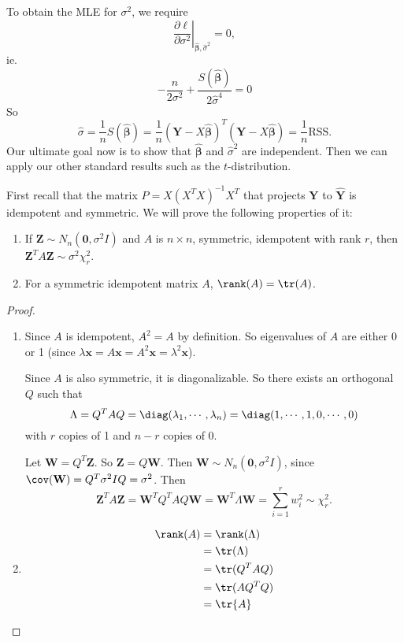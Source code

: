 \documentclass[a4paper]{article}
\begin{document}
To obtain the MLE for $\sigma^2$, we require
\[
  \left.\frac{\partial \ell}{\partial \sigma^2}\right|_{\hat{\boldsymbol\beta}, \hat{\sigma}^2} = 0,
\]
ie.
\[
  -\frac{n}{2\sigma^2} + \frac{S(\hat{\boldsymbol\beta})}{2 \hat{\sigma}^4} = 0
\]
So
\[
  \hat{\sigma} = \frac{1}{n}S(\hat{\boldsymbol\beta}) = \frac{1}{n}(\mathbf{Y} - X\hat{\boldsymbol\beta})^T(\mathbf{Y} - X\hat{\boldsymbol\beta}) = \frac{1}{n}\mathrm{RSS}.
\]
Our ultimate goal now is to show that $\hat{\boldsymbol\beta}$ and $\hat{\sigma}^2$ are independent. Then we can apply our other standard results such as the $t$-distribution.

First recall that the matrix $P = X(X^TX)^{-1}X^T$ that projects $\mathbf{Y}$ to $\hat{\mathbf{Y}}$ is idempotent and symmetric. We will prove the following properties of it:
\begin{lemma}\leavevmode
  \begin{enumerate}
    \item If $\mathbf{Z}\sim N_n(\mathbf{0}, \sigma^2 I)$ and $A$ is $n\times n$, symmetric, idempotent with rank $r$, then $\mathbf{Z}^TA\mathbf{Z} \sim \sigma^2 \chi_r^2$.
    \item For a symmetric idempotent matrix $A$, $\rank(A) = \tr(A)$.
  \end{enumerate}
\end{lemma}

\begin{proof}\leavevmode
  \begin{enumerate}
    \item Since $A$ is idempotent, $A^2 = A$ by definition. So eigenvalues of $A$ are either 0 or 1 (since $\lambda \mathbf{x} = A\mathbf{x} = A^2 \mathbf{x} = \lambda^2 \mathbf{x}$).

      Since $A$ is also symmetric, it is diagonalizable. So there exists an orthogonal $Q$ such that
      \[
        \Lambda = Q^TAQ = \diag(\lambda_1, \cdots, \lambda_n) = \diag(1, \cdots, 1, 0, \cdots, 0)
      \]
      with $r$ copies of 1 and $n - r$ copies of $0$.

      Let $\mathbf{W} = Q^T\mathbf{Z}$. So $\mathbf{Z} = Q\mathbf{W}$. Then $\mathbf{W}\sim N_n(\mathbf{0}, \sigma^2 I)$, since $\cov(\mathbf{W}) = Q^T\sigma^2 IQ = \sigma^2$. Then
      \[
        \mathbf{Z}^TA\mathbf{Z} = \mathbf{W}^T Q^TAQ\mathbf{W} = \mathbf{W}^T\Lambda \mathbf{W} = \sum_{i = 1}^r w_i^2 \sim \chi_r^2.
      \]
    \item
      \begin{align*}
        \rank (A) &= \rank (\Lambda)\\
        &= \tr (\Lambda)\\
        &= \tr (Q^TAQ)\\
        &= \tr (AQ^TQ)\\
        &= \tr {A}
      \end{align*}
  \end{enumerate}
\end{proof}
\end{document}
